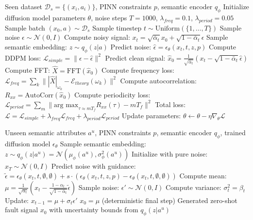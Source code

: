 \documentclass[journal]{IEEEtran}
\begin{document}
\begin{algorithm}[h]
\caption{PC-Diffusion Training}
\label{alg:train}
\begin{algorithmic}[1]
\REQUIRE Seen dataset $\mathcal{D}_s = \{(x_i, a_i)\}$, PINN constraints $p$, semantic encoder $q_\phi$
\STATE Initialize diffusion model parameters $\theta$, noise steps $T=1000$, $\lambda_{freq}=0.1$, $\lambda_{period}=0.05$
\REPEAT
    \STATE Sample batch $(x_0, a) \sim \mathcal{D}_s$
    \STATE Sample timestep $t \sim \text{Uniform}(\{1, \dots, T\})$
    \STATE Sample noise $\epsilon \sim \mathcal{N}(0, I)$
    \STATE Compute noisy signal: $x_t = \sqrt{\bar{\alpha}_t}x_0 + \sqrt{1-\bar{\alpha}_t}\epsilon$
    \STATE Sample semantic embedding: $z \sim q_\phi(z|a)$
    \STATE Predict noise: $\hat{\epsilon} = \epsilon_\theta(x_t, t, z, p)$
    \STATE Compute DDPM loss: $\mathcal{L}_{simple} = \| \epsilon - \hat{\epsilon} \|^2$
    \STATE Predict clean signal: $\hat{x}_0 = \frac{1}{\sqrt{\bar{\alpha}_t}}(x_t - \sqrt{1-\bar{\alpha}_t}\hat{\epsilon})$
    \STATE Compute FFT: $\hat{X} = \text{FFT}(\hat{x}_0)$
    \STATE Compute frequency loss: $\mathcal{L}_{freq} = \sum_k \||\hat{X}|_{\omega_k} - \mathcal{E}_{theory}(\omega_k)\|^2$
    \STATE Compute autocorrelation: $R_{xx} = \text{AutoCorr}(\hat{x}_0)$
    \STATE Compute periodicity loss: $\mathcal{L}_{period} = \sum_m \|\text{arg max}_{\tau \approx m T_f} R_{xx}(\tau) - m T_f\|^2$
    \STATE Total loss: $\mathcal{L} = \mathcal{L}_{simple} + \lambda_{freq} \mathcal{L}_{freq} + \lambda_{period} \mathcal{L}_{period}$
    \STATE Update parameters: $\theta \leftarrow \theta - \eta \nabla_\theta \mathcal{L}$
\end{algorithmic}
\end{algorithm}

\begin{algorithm}[h]
\caption{Zero-Shot Inference with PC-Diffusion}
\label{alg:infer}
\begin{algorithmic}[1]
\REQUIRE Unseen semantic attributes $a^u$, PINN constraints $p$, semantic encoder $q_\phi$, trained diffusion model $\epsilon_\theta$
\STATE Sample semantic embedding: $z \sim q_\phi(z|a^u) = \mathcal{N}(\mu_\phi(a^u), \sigma_\phi^2(a^u))$
\STATE Initialize with pure noise: $x_T \sim \mathcal{N}(0, I)$
    \STATE Predict noise with guidance: $\tilde{\epsilon} = \epsilon_\theta(x_t, t, \emptyset, \emptyset) + s \cdot (\epsilon_\theta(x_t, t, z, p) - \epsilon_\theta(x_t, t, \emptyset, \emptyset))$
    \STATE Compute mean: $\mu = \frac{1}{\sqrt{\alpha_t}} \left( x_t - \frac{1-\alpha_t}{\sqrt{1-\bar{\alpha}_t}} \tilde{\epsilon} \right)$
        \STATE Sample noise: $\epsilon' \sim \mathcal{N}(0, I)$
        \STATE Compute variance: $\sigma_t^2 = \beta_t$
        \STATE Update: $x_{t-1} = \mu + \sigma_t \epsilon'$
    \ELSE
        \STATE $x_0 = \mu$ (deterministic final step)
    \ENDIF
\ENDFOR
\RETURN Generated zero-shot fault signal $x_0$ with uncertainty bounds from $q_\phi(z|a^u)$
\end{algorithmic}
\end{algorithm}
\end{document}
